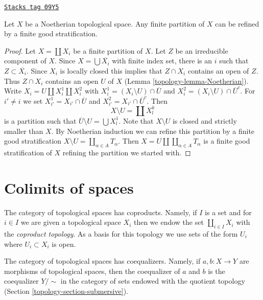 \begin{lemma}
\label{topology-lemma-noetherian-partition-refined-by-stratification}
\href{https://stacks.math.columbia.edu/tag/09Y5}{\texttt{Stacks tag 09Y5}}

Let $X$ be a Noetherian topological space. Any finite partition
of $X$ can be refined by a finite good stratification.
\end{lemma}

\begin{proof}

Let $X = \coprod X_i$ be a finite partition of $X$.
Let $Z$ be an irreducible component of $X$. Since $X = \bigcup \overline{X_i}$
with finite index set, there is an $i$ such that
$Z \subset \overline{X_i}$. Since $X_i$ is locally closed this
implies that $Z \cap X_i$ contains an open of $Z$. Thus
$Z \cap X_i$ contains an open $U$ of $X$ (Lemma \ref{topology-lemma-Noetherian}).
Write $X_i = U \amalg X_i^1 \amalg X_i^2$ with
$X_i^1 = (X_i \setminus U) \cap \overline{U}$ and
$X_i^2 = (X_i \setminus U) \cap \overline{U}^c$.
For $i' \not = i$ we set
$X_{i'}^1 = X_{i'} \cap \overline{U}$ and
$X_{i'}^2 = X_{i'} \cap \overline{U}^c$.
Then
$$
X \setminus U = \coprod X^k_l
$$
is a partition such that $\overline{U} \setminus U = \bigcup X_l^1$.
Note that $X \setminus U$ is closed and strictly smaller than $X$.
By Noetherian induction we can refine this partition
by a finite good stratification
$X \setminus U = \coprod_{\alpha \in A} T_\alpha$.
Then $X = U \amalg \coprod_{\alpha \in A} T_\alpha$ is a finite
good stratification of $X$ refining the partition we started with.
\end{proof}

\section{Colimits of spaces}
\label{topology-section-colimits}
The category of topological spaces has coproducts. Namely, if $I$ is a set
and for $i \in I$ we are given a topological space $X_i$ then we endow
the set $\coprod_{i \in I} X_i$ with the {\it coproduct topology}.
As a basis for this topology we use sets of the form $U_i$ where
$U_i \subset X_i$ is open.

\medskip\noindent
The category of topological spaces has coequalizers. Namely, if
$a, b : X \to Y$ are morphisms of topological spaces, then the
coequalizer of $a$ and $b$ is the coequalizer $Y/\sim$ in the category
of sets endowed with the quotient topology (Section \ref{topology-section-submersive}).

